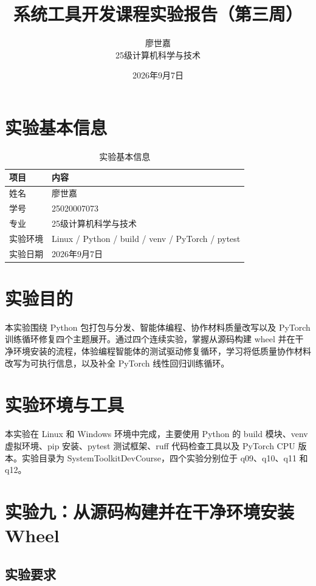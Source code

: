 \documentclass[UTF8]{ctexart}
\title{\textbf{系统工具开发课程实验报告（第三周）}}
\author{廖世嘉 \quad 25020007073 \\ 25级计算机科学与技术}
\date{2026年9月7日}
\begin{document}
\maketitle
\tableofcontents
\newpage

\section{实验基本信息}

\begin{table}[htbp]
\centering
\caption{实验基本信息}
\label{tab:info}
\begin{tabular}{ll}
\toprule
项目 & 内容 \\
\midrule
姓名 & 廖世嘉 \\
学号 & 25020007073 \\
专业 & 25级计算机科学与技术 \\
实验环境 & Linux / Python / build / venv / PyTorch / pytest \\
实验日期 & 2026年9月7日 \\
\bottomrule
\end{tabular}
\end{table}

\section{实验目的}

本实验围绕 Python 包打包与分发、智能体编程、协作材料质量改写以及 PyTorch 训练循环修复四个主题展开。通过四个连续实验，掌握从源码构建 wheel 并在干净环境安装的流程，体验编程智能体的测试驱动修复循环，学习将低质量协作材料改写为可执行信息，以及补全 PyTorch 线性回归训练循环。

\section{实验环境与工具}

本实验在 Linux 和 Windows 环境中完成，主要使用 Python 的 build 模块、venv 虚拟环境、pip 安装、pytest 测试框架、ruff 代码检查工具以及 PyTorch CPU 版本。实验目录为 SystemToolkitDevCourse，四个实验分别位于 q09、q10、q11 和 q12。

\section{实验九：从源码构建并在干净环境安装 Wheel}

\subsection{实验要求}
\end{document}
